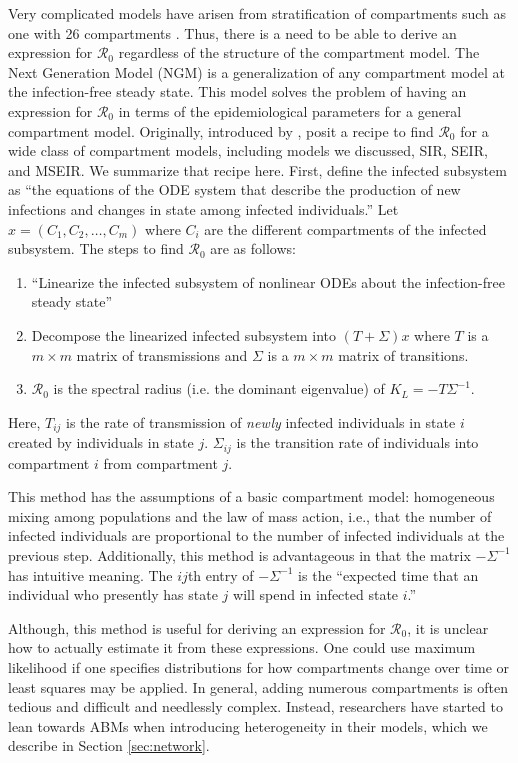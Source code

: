 \documentclass[12pt]{article}
\newcommand{\rr}{\ensuremath{\mathcal{R}_0}}
\begin{document}
Very complicated models have arisen from stratification of compartments such as one with 26 compartments \citep{pandey2014}.  Thus, there is a need to be able to derive an expression for $\rr$ regardless of the structure of the compartment model.   The Next Generation Model (NGM) is a generalization of any compartment model at the infection-free steady state. This model solves the problem of having an expression for $\rr$ in terms of the epidemiological parameters for a general compartment model.  Originally, introduced by \citep{diekmann1990}, \cite{diekmann2009} posit a recipe to find $\rr$ for a wide class of compartment models, including models we discussed, SIR, SEIR, and MSEIR. We summarize that recipe here. First, define the infected subsystem as ``the equations of the ODE system that describe the production of new infections and changes in state among infected individuals.''  Let $x = (C_1, C_2, \dots, C_m)$ where $C_i$ are the different compartments of the infected subsystem.  The steps to find $\rr$ are as follows:


\begin{enumerate}
\item ``Linearize the infected subsystem of nonlinear ODEs about the infection-free steady state''
\item Decompose the linearized infected subsystem into $(T + \Sigma )x$ where $T$ is a $m\times m$ matrix of transmissions and $\Sigma$ is a $m \times m$ matrix of transitions.
\item $\rr$ is the spectral radius (i.e. the dominant eigenvalue) of $K_L=-T \Sigma^{-1}$.  
\end{enumerate}

Here, $T_{ij}$ is the rate of transmission of \textit{newly} infected individuals in state $i$ created by individuals in state $j$.  $\Sigma_{ij}$ is the transition rate of individuals into compartment $i$ from compartment $j$.

This method has the assumptions of a basic compartment model: homogeneous mixing among populations and the law of mass action, i.e., that the number of infected individuals are proportional to the number of infected individuals at the previous step.   Additionally, this method is advantageous in that the matrix $-\Sigma^{-1}$ has intuitive meaning.  The $ij$th entry of $- \Sigma^{-1}$ is the ``expected time that an individual who presently has state $j$ will spend in infected state $i$.''

Although, this method is useful for deriving an expression for $\rr$, it is unclear how to actually estimate it from these expressions.  One could use maximum likelihood if one specifies distributions for how compartments change over time or least squares may be applied. In general, adding numerous compartments is often tedious and difficult and needlessly complex.  Instead, researchers have started to lean towards ABMs when introducing heterogeneity in their models, which we describe in Section \ref{sec:network}.  
\end{document}
